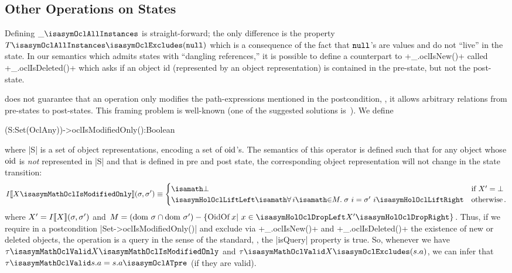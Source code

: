 \subsection{Other Operations on States}
Defining $\_\isasymOclAllInstances$
is straight-forward; the only difference is the property
$T\isasymOclAllInstances\isasymOclExcludes(\isasymOclNull)$ which is a
consequence of the fact that ${\mathtt{null}_\text{{}}}$'s are values and do not ``live'' in the
state.  In our semantics which admits states with ``dangling references,'' it is
possible to define a counterpart to \inlineocl+_.oclIsNew()+ called
\inlineocl+_.oclIsDeleted()+ which asks if an object id (represented by an object
representation) is contained in the pre-state, but not the post-state.

\OCL does not guarantee that an operation only modifies the path-expressions
mentioned in the postcondition, \ie, it allows arbitrary relations from
pre-states to post-states.  This framing problem is well-known (one of the
suggested solutions is~\cite{kosiuczenko:specification:2006}). We define
\begin{ocl}
 (S:Set(OclAny))->oclIsModifiedOnly():Boolean
\end{ocl}
where \inlineocl|S| is a set of object representations, encoding
a set of $\mathrm{oid}$'s. The semantics of this operator is defined such that
for any object whose $\mathrm{oid}$ is \emph{not }represented in \inlineocl|S|
and that is defined in pre and post state, the corresponding object representation will not change
in the state transition:
\begin{gather*}
I\semantics{X\isasymMathOclIsModifiedOnly} (\sigma, \sigma')  \equiv
  \begin{cases}
    \isasymbottom & \text{if $X' = \bottom$}  \\
     \lift{\isasymforall i \isasymin M\spot
        \sigma~i = \sigma'~i} & \text{otherwise}\mi{.}
   \end{cases}
\end{gather*}
where $X' = I\llbracket X \rrbracket (\sigma, \sigma')$ and $M=
(\dom~\sigma\cap\dom~\sigma') - \{ \HolOclOidOf x |~x \in\drop{X'}\}$.  Thus, if
we require in a postcondition \inlineocl|Set{}->oclIsModifiedOnly()| and exclude via
\inlineocl+_.oclIsNew()+ and \inlineocl+_.oclIsDeleted()+ the existence of new
or deleted objects, the operation is a query in the sense of the \OCL standard, \ie,
the \inlineocl|isQuery| property is true. So, whenever we have $ \tau
\isasymMathOclValid X\isasymMathOclIsModifiedOnly$ and $ \tau
\isasymMathOclValid X\isasymOclExcludes(s.a)$, we can infer that $\tau
\isasymMathOclValid s.a = s.a\isasymOclATpre$ (if they are valid).


